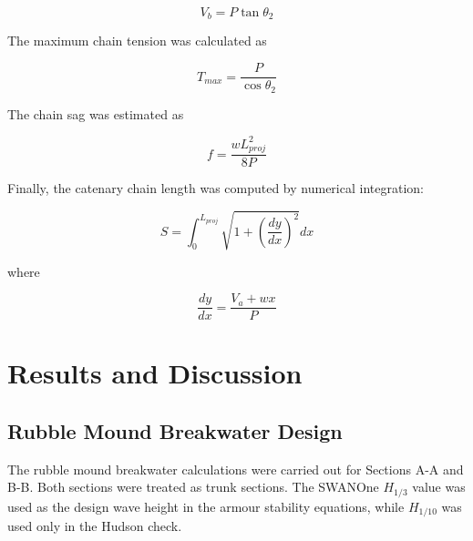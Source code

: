 \documentclass[a4paper, 11pt]{article}
\begin{document}
\begin{equation}
    V_b=P\tan\theta_2
\end{equation}

The maximum chain tension was calculated as

\begin{equation}
    T_{max}=\frac{P}{\cos\theta_2}
\end{equation}

The chain sag was estimated as

\begin{equation}
    f=\frac{wL_{proj}^{2}}{8P}
\end{equation}

Finally, the catenary chain length was computed by numerical integration:

\begin{equation}
    S=
    \int_0^{L_{proj}}
    \sqrt{
    1+
    \left(
    \frac{dy}{dx}
    \right)^2
    }
    dx
\end{equation}

where

\begin{equation}
    \frac{dy}{dx}=
    \frac{V_a+wx}{P}
\end{equation}



\section{Results and Discussion}

\subsection{Rubble Mound Breakwater Design}

\hspace*{0.5cm} The rubble mound breakwater calculations were carried out for Sections A-A and B-B. Both sections were treated as trunk sections. The SWANOne \(H_{1/3}\) value was used as the design wave height in the armour stability equations, while \(H_{1/10}\) was used only in the Hudson check.
\end{document}
